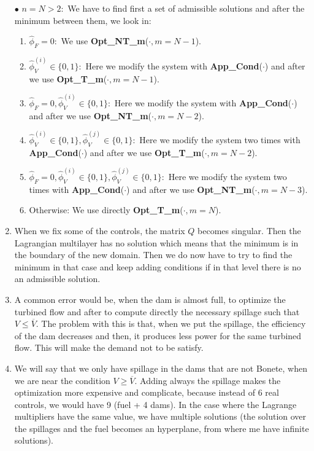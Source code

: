 \documentclass[12pt]{article}
\theoremstyle{definition}
\theoremstyle{remark}
\begin{document}
\begin{enumerate}
\item[$\bullet$] $n=N>2:$ We have to find first a set of admissible solutions and after the minimum between them, we look in:
\begin{enumerate}
\item $\hat{\phi}_F=0:$ We use \textbf{Opt\_NT\_m}($\cdot,m=N-1$).
\item $\hat{\phi}_V^{(i)}\in\{0,1\}:$ Here we modify the system with \textbf{App\_Cond}($\cdot$) and after we use \textbf{Opt\_T\_m}($\cdot,m=N-1$).
\item $\hat{\phi}_F=0,\hat{\phi}_V^{(i)}\in\{0,1\}:$ Here we modify the system with \textbf{App\_Cond}($\cdot$) and after we use \textbf{Opt\_NT\_m}($\cdot,m=N-2$).
\item $\hat{\phi}_V^{(i)}\in\{0,1\},\hat{\phi}_V^{(j)}\in\{0,1\}:$ Here we modify the system two times with \textbf{App\_Cond}($\cdot$) and after we use \textbf{Opt\_T\_m}($\cdot,m=N-2$).
\item $\hat{\phi}_F=0,\hat{\phi}_V^{(i)}\in\{0,1\},\hat{\phi}_V^{(j)}\in\{0,1\}:$ Here we modify the system two times with \textbf{App\_Cond}($\cdot$) and after we use \textbf{Opt\_NT\_m}($\cdot,m=N-3$).
\item Otherwise: We use directly \textbf{Opt\_T\_m}($\cdot,m=N$).

\end{enumerate}

\item When we fix some of the controls, the matrix $Q$ becomes singular. Then the Lagrangian multilayer has no solution which means that the minimum is in the boundary of the new domain. Then we do now have to try to find the minimum in that case and keep adding conditions if in that level there is no an admissible solution.

\item A common error would be, when the dam is almost full, to optimize the turbined flow and after to compute directly the necessary spillage such that $V\leq\overline{V}$. The problem with this is that, when we put the spillage, the efficiency of the dam decreases and then, it produces less power for the same turbined flow. This will make the demand not to be satisfy.

\item We will say that we only have spillage in the dams that are not Bonete, when we are near the condition $V\geq\overline{V}$. Adding always the spillage makes the optimization more expensive and complicate, because instead of 6 real controls, we would have 9 (fuel + 4 dams). In the case where the Lagrange multipliers have the same value, we have multiple solutions (the solution over the spillages and the fuel becomes an hyperplane, from where me have infinite solutions).


\end{enumerate}
\end{document}

